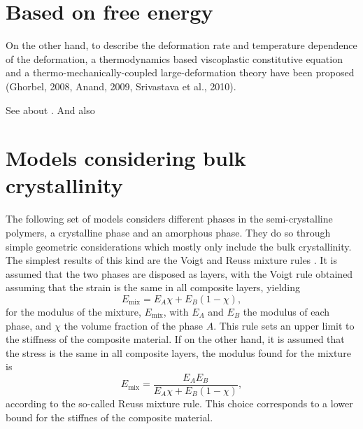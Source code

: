 \section{Based on free energy}

On the other hand, to describe the
deformation rate and temperature dependence of the deformation, a thermodynamics based
viscoplastic constitutive equation and a thermo-mechanically-coupled large-deformation theory have
been proposed (Ghorbel, 2008, Anand, 2009, Srivastava et al., 2010). \cite{uchidaMicroMesoMacroscopic2013}

\colorbox{BrickRed}{See about \cite{anandTheoryAmorphousSolids2003}. And also \cite{ghorbelViscoplasticConstitutiveModel2008,anandThermomechanicallyCoupledTheory2009, amesThermomechanicallyCoupledTheory2009, pouriayevaliConstitutiveDescriptionRatesensitive2013}}

\section{Models considering bulk crystallinity}

The following set of models considers different phases in the semi-crystalline polymers, a crystalline phase and an amorphous phase.
They do so through simple geometric considerations which mostly only include the bulk crystallinity.
The simplest results of this kind are the Voigt and Reuss mixture rules \citep{wardIntroductionMechanicalProperties2004}.
It is assumed that the two phases are disposed as layers, with the Voigt rule obtained assuming that the strain is the same in all composite layers, yielding
\begin{equation}
	\label{eq:voigt_mixture_rule}
	E_\text{mix} = E_A \chi + E_B (1 - \chi),
\end{equation}
for the modulus of the mixture, $E_\text{mix}$, with $E_A$ and $E_B$ the modulus of each phase, and $\chi$ the volume fraction of the phase $A$.
This rule sets an upper limit to the stiffness of the composite material.
If on the other hand, it is assumed that the stress is the same in all composite layers, the modulus found for the mixture is
\begin{equation}
	E_\text{mix} = \frac{E_A E_B}{E_A \chi + E_B (1-\chi)},
\end{equation}
according to the so-called Reuss mixture rule.
This choice corresponds to a lower bound for the stiffnes of the composite material.


